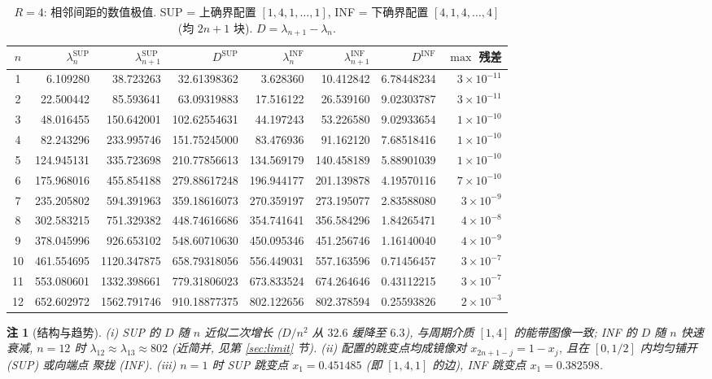 \documentclass[UTF8]{ctexart}
\newtheorem{remark}[theorem]{注}
\begin{document}
\begin{table}[ht]
\centering
\caption{$R=4$: 相邻间距的数值极值. SUP = 上确界配置 $[1,4,1,\dots,1]$,
INF = 下确界配置 $[4,1,4,\dots,4]$ (均 $2n+1$ 块). $D = \lambda_{n+1}-\lambda_n$.}
\label{tab:r4}
\small
\begin{tabular}{c|rrr|rrr|r}
	$n$ & $\lambda_n^{\mathrm{SUP}}$ & $\lambda_{n+1}^{\mathrm{SUP}}$ & $D^{\mathrm{SUP}}$ &
	$\lambda_n^{\mathrm{INF}}$ & $\lambda_{n+1}^{\mathrm{INF}}$ & $D^{\mathrm{INF}}$ &
	$\max$ 残差 \\\hline
	1 & 6.109280 & 38.723263 & 32.61398362 & 3.628360 & 10.412842 & 6.78448234 & $3\times10^{-11}$\\
	2 & 22.500442 & 85.593641 & 63.09319883 & 17.516122 & 26.539160 & 9.02303787 & $3\times10^{-11}$\\
	3 & 48.016455 & 150.642001 & 102.62554631 & 44.197243 & 53.226580 & 9.02933654 & $1\times10^{-10}$\\
	4 & 82.243296 & 233.995746 & 151.75245000 & 83.476936 & 91.162120 & 7.68518416 & $1\times10^{-10}$\\
	5 & 124.945131 & 335.723698 & 210.77856613 & 134.569179 & 140.458189 & 5.88901039 & $1\times10^{-10}$\\
	6 & 175.968016 & 455.854188 & 279.88617248 & 196.944177 & 201.139878 & 4.19570116 & $7\times10^{-10}$\\
	7 & 235.205802 & 594.391963 & 359.18616073 & 270.359197 & 273.195077 & 2.83588080 & $3\times10^{-9}$\\
	8 & 302.583215 & 751.329382 & 448.74616686 & 354.741641 & 356.584296 & 1.84265471 & $4\times10^{-8}$\\
	9 & 378.045996 & 926.653102 & 548.60710630 & 450.095346 & 451.256746 & 1.16140040 & $4\times10^{-9}$\\
	10 & 461.554695 & 1120.347875 & 658.79318056 & 556.449031 & 557.163596 & 0.71456457 & $3\times10^{-7}$\\
	11 & 553.080601 & 1332.398661 & 779.31806023 & 673.833524 & 674.264646 & 0.43112215 & $3\times10^{-7}$\\
	12 & 652.602972 & 1562.791746 & 910.18877375 & 802.122656 & 802.378594 & 0.25593826 & $2\times10^{-3}$\\
\end{tabular}
\end{table}

\begin{remark}[结构与趋势]
	(i) SUP 的 $D$ 随 $n$ 近似二次增长 ($D/n^2$ 从 $32.6$ 缓降至 $6.3$),
	与周期介质 $[1,4]$ 的能带图像一致; INF 的 $D$ 随 $n$ 快速衰减,
	$n = 12$ 时 $\lambda_{12} \approx \lambda_{13} \approx 802$ (近简并,
	见第 \ref{sec:limit} 节). (ii) 配置的跳变点均成镜像对
	$x_{2n+1-j} = 1 - x_j$, 且在 $[0, 1/2]$ 内均匀铺开 (SUP) 或向端点
	聚拢 (INF). (iii) $n=1$ 时 SUP 跳变点 $x_1 = 0.451485$ (即
	$[1,4,1]$ 的边), INF 跳变点 $x_1 = 0.382598$.
\end{remark}
\end{document}
